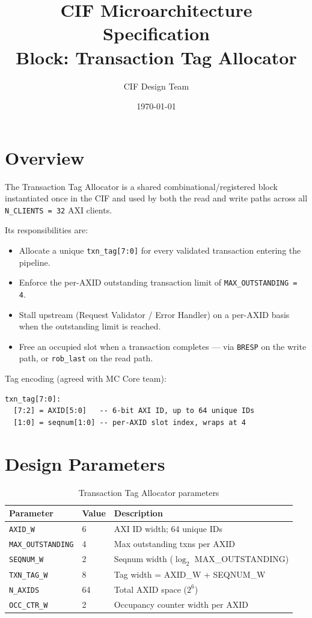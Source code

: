 \documentclass[11pt,a4paper]{article}
\title{\textbf{CIF Microarchitecture Specification}\\[0.4em]
\large Block: Transaction Tag Allocator}
\author{CIF Design Team}
\date{\today}
\begin{document}
\maketitle
\thispagestyle{fancy}
\tableofcontents
\newpage

\section{Overview}

The Transaction Tag Allocator is a shared combinational/registered block
instantiated once in the CIF and used by both the read and write paths
across all \texttt{N\_CLIENTS = 32} AXI clients.

Its responsibilities are:
\begin{itemize}
  \item Allocate a unique \texttt{txn\_tag[7:0]} for every validated
        transaction entering the pipeline.
  \item Enforce the per-AXID outstanding transaction limit of
        \texttt{MAX\_OUTSTANDING = 4}.
  \item Stall upstream (Request Validator / Error Handler) on a per-AXID
        basis when the outstanding limit is reached.
  \item Free an occupied slot when a transaction completes — via
        \texttt{BRESP} on the write path, or \texttt{rob\_last} on the
        read path.
\end{itemize}

Tag encoding (agreed with MC Core team):
\begin{lstlisting}
txn_tag[7:0]:
  [7:2] = AXID[5:0]   -- 6-bit AXI ID, up to 64 unique IDs
  [1:0] = seqnum[1:0] -- per-AXID slot index, wraps at 4
\end{lstlisting}

\section{Design Parameters}

\begin{table}[h!]
\centering
\begin{tabular}{lll}
\toprule
\textbf{Parameter} & \textbf{Value} & \textbf{Description} \\
\midrule
\texttt{AXID\_W}           & 6   & AXI ID width; 64 unique IDs \\
\texttt{MAX\_OUTSTANDING}  & 4   & Max outstanding txns per AXID \\
\texttt{SEQNUM\_W}         & 2   & Seqnum width (\(\log_2\) MAX\_OUTSTANDING) \\
\texttt{TXN\_TAG\_W}       & 8   & Tag width = AXID\_W + SEQNUM\_W \\
\texttt{N\_AXIDS}          & 64  & Total AXID space ($2^6$) \\
\texttt{OCC\_CTR\_W}       & 2   & Occupancy counter width per AXID \\
\bottomrule
\end{tabular}
\caption{Transaction Tag Allocator parameters}
\end{table}
\end{document}
